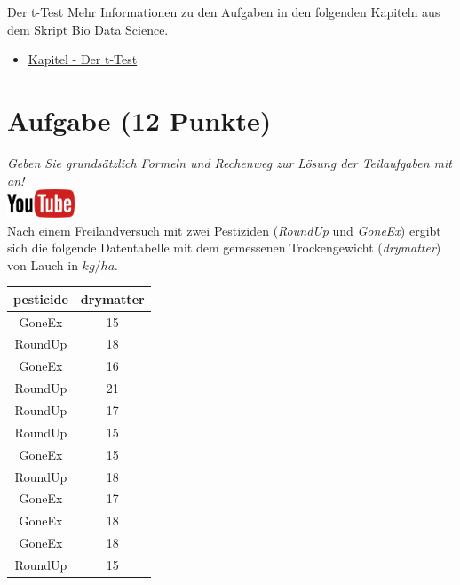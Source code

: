 \documentclass[a4paper, 9pt]{scrartcl}\usepackage[]{graphicx}\usepackage[]{xcolor}
\begin{document}
\clearpage
\begin{graybox}{Der t-Test}
Mehr Informationen zu den Aufgaben in den folgenden Kapiteln aus dem Skript Bio Data Science.
  \begin{itemize}
  \item \href{https://jkruppa.github.io/stat-tests-ttest.html}{Kapitel - Der t-Test}
  \end{itemize}
\end{graybox}
\clearpage

\section{Aufgabe \hfill (12 Punkte)}

\textit{Geben Sie grunds{\"a}tzlich Formeln und Rechenweg zur L{\"o}sung der
  Teilaufgaben mit an!} \\[1Ex]

\hfill\href{https://youtu.be/Cq_rF_z4xOk}{\includegraphics[width =
  2cm]{img/youtube}}\\[1Ex]



Nach einem Freilandversuch mit zwei Pestiziden (\textit{RoundUp} und
\textit{GoneEx}) ergibt sich die folgende Datentabelle mit dem gemessenen
Trockengewicht (\textit{drymatter}) von Lauch in $kg/ha$.

\begin{table}[!h]
\centering
\begin{tabular}{cc}
\toprule
pesticide & drymatter\\
\midrule
GoneEx & 15\\
RoundUp & 18\\
GoneEx & 16\\
RoundUp & 21\\
RoundUp & 17\\
\addlinespace
RoundUp & 15\\
GoneEx & 15\\
RoundUp & 18\\
GoneEx & 17\\
GoneEx & 18\\
\addlinespace
GoneEx & 18\\
RoundUp & 15\\
\bottomrule
\end{tabular}
\end{table}
\end{document}
